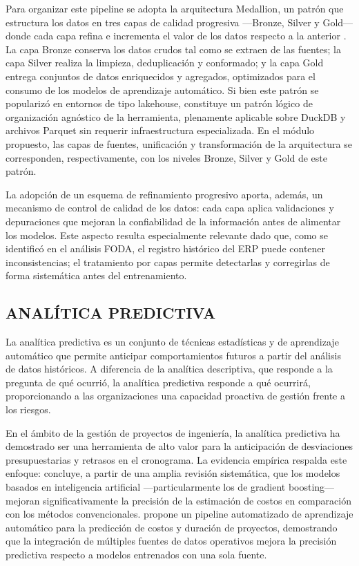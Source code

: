 \documentclass{univalle-perfil}
\begin{document}
Para organizar este pipeline se adopta la arquitectura Medallion, un patrón que estructura los datos en tres capas de calidad progresiva —Bronze, Silver y Gold— donde cada capa refina e incrementa el valor de los datos respecto a la anterior \parencite{DatabricksMedallion}. La capa Bronze conserva los datos crudos tal como se extraen de las fuentes; la capa Silver realiza la limpieza, deduplicación y conformado; y la capa Gold entrega conjuntos de datos enriquecidos y agregados, optimizados para el consumo de los modelos de aprendizaje automático. Si bien este patrón se popularizó en entornos de tipo lakehouse, constituye un patrón lógico de organización agnóstico de la herramienta, plenamente aplicable sobre DuckDB y archivos Parquet sin requerir infraestructura especializada. En el módulo propuesto, las capas de fuentes, unificación y transformación de la arquitectura se corresponden, respectivamente, con los niveles Bronze, Silver y Gold de este patrón.

La adopción de un esquema de refinamiento progresivo aporta, además, un mecanismo de control de calidad de los datos: cada capa aplica validaciones y depuraciones que mejoran la confiabilidad de la información antes de alimentar los modelos. Este aspecto resulta especialmente relevante dado que, como se identificó en el análisis FODA, el registro histórico del ERP puede contener inconsistencias; el tratamiento por capas permite detectarlas y corregirlas de forma sistemática antes del entrenamiento.

\subsection{ANALÍTICA PREDICTIVA}

La analítica predictiva es un conjunto de técnicas estadísticas y de aprendizaje automático que permite anticipar comportamientos futuros a partir del análisis de datos históricos. A diferencia de la analítica descriptiva, que responde a la pregunta de qué ocurrió, la analítica predictiva responde a qué ocurrirá, proporcionando a las organizaciones una capacidad proactiva de gestión frente a los riesgos.

En el ámbito de la gestión de proyectos de ingeniería, la analítica predictiva ha demostrado ser una herramienta de alto valor para la anticipación de desviaciones presupuestarias y retrasos en el cronograma. La evidencia empírica respalda este enfoque: \textcite{AIcostEstimation2024} concluye, a partir de una amplia revisión sistemática, que los modelos basados en inteligencia artificial —particularmente los de gradient boosting— mejoran significativamente la precisión de la estimación de costos en comparación con los métodos convencionales. \textcite{AutoMLpipeline2025} propone un pipeline automatizado de aprendizaje automático para la predicción de costos y duración de proyectos, demostrando que la integración de múltiples fuentes de datos operativos mejora la precisión predictiva respecto a modelos entrenados con una sola fuente.
\end{document}
